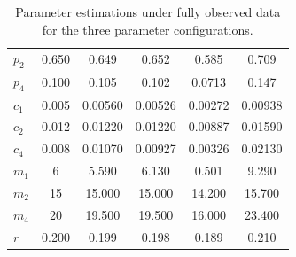 \documentclass[pdflatex,sn-mathphys-num]{sn-jnl}
\theoremstyle{thmstyleone}%
\theoremstyle{thmstyletwo}%
\theoremstyle{thmstylethree}%
\begin{document}
\begin{table}[h]
\begin{tabular}{lccccc}
        $p_2$ & 0.650 & 0.649 & 0.652 & 0.585 & 0.709  \\
        $p_4$ & 0.100 &  0.105 & 0.102 & 0.0713 & 0.147 \\
        $c_1$ & 0.005 & 0.00560 & 0.00526 & 0.00272 & 0.00938 \\
        $c_2$ & 0.012 & 0.01220 & 0.01220 & 0.00887 & 0.01590 \\
        $c_4$ & 0.008 & 0.01070 & 0.00927 & 0.00326 & 0.02130  \\
        $m_1$ & 6 & 5.590 & 6.130 & 0.501 & 9.290\\
        $m_2$ & 15 & 15.000 & 15.000 & 14.200 & 15.700 \\
        $m_4$ & 20 & 19.500 & 19.500 & 16.000 & 23.400 \\
        $r$ & 0.200 & 0.199 & 0.198 & 0.189 & 0.210\\
        \bottomrule
    \end{tabular}
    \caption{Parameter estimations under fully observed data for the three parameter configurations.}
    \label{tab:par_est_full}
\end{table}
\end{document}

